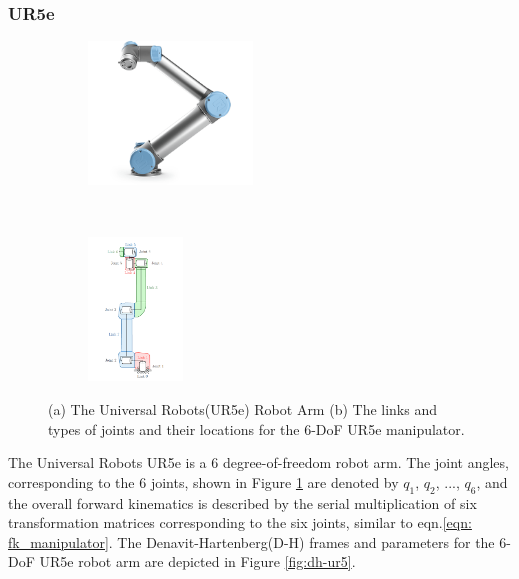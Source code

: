 \subsubsection{UR5e}

\begin{figure}[t!]
    \centering
    \begin{subfigure}[t]{0.4\textwidth}
        \centering
        \includegraphics[height=1.5in]{figures/background/ur5e_overview.png}
    \end{subfigure}%
    ~ 
    \begin{subfigure}[t]{0.5\textwidth}
        \centering
        \includegraphics[height=1.5in]{figures/background/ur5e_links.png}
    \end{subfigure}
    \caption[Universal Robots(UR5e) Robot Arm]{(a) The Universal Robots(UR5e) Robot Arm (b) The links and types of joints and their locations for the 6-DoF UR5e manipulator.}
    \label{fig:ur5e}
\end{figure}

The Universal Robots UR5e is a 6 degree-of-freedom robot arm. The joint angles, corresponding to the 6 joints, shown in Figure \ref{fig:ur5e} are denoted by $q_1$, $q_2$, ..., $q_6$, and the overall forward kinematics is described by the serial multiplication of six transformation matrices corresponding to the six joints, similar to eqn.\ref{eqn: fk_manipulator}. The Denavit-Hartenberg(D-H) frames and parameters for the 6-DoF UR5e robot arm are depicted in Figure \ref{fig:dh-ur5}.

